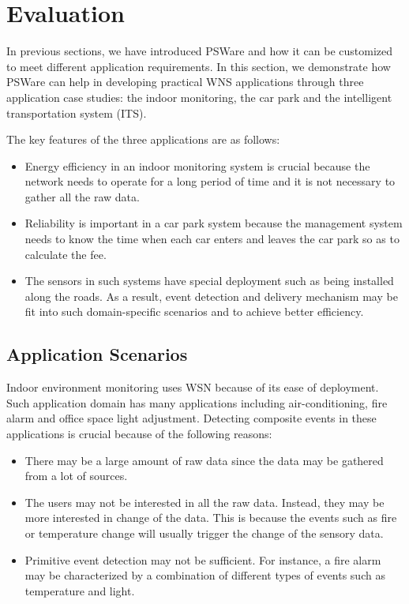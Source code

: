 \section{Evaluation}
\label{sec:pswareImpl}
In previous sections, we have introduced PSWare and how it can be customized to meet different application requirements. In this section, we demonstrate how PSWare can help in developing practical WNS applications through three application case studies: the indoor monitoring, the car park and the intelligent transportation system (ITS).

The key features of the three applications are as follows:
\begin{itemize}
\item Energy efficiency in an indoor monitoring system is crucial because the network needs to operate for a long period of time and it is not necessary to gather all the raw data.
\item Reliability is important in a car park system because the management system needs to know the time when each car enters and leaves the car park so as to calculate the fee.
\item The sensors in such systems have special deployment such as being installed along the roads. As a result, event detection and delivery mechanism may be fit into such domain-specific scenarios and to achieve better efficiency.
\end{itemize}

\subsection{Application Scenarios}
Indoor environment monitoring uses WSN because of its ease of deployment. Such application domain has many applications including air-conditioning, fire alarm and office space light adjustment. Detecting composite events in these applications is crucial because of the following reasons:
\begin{itemize}
\item There may be a large amount of raw data since the data may be gathered from a lot of sources.
\item The users may not be interested in all the raw data. Instead, they may be more interested in change of the data. This is because the events such as fire or temperature change will usually trigger the change of the sensory data. 
\item Primitive event detection may not be sufficient. For instance, a fire alarm may be characterized by a combination of different types of events such as temperature and light.
\end{itemize}


